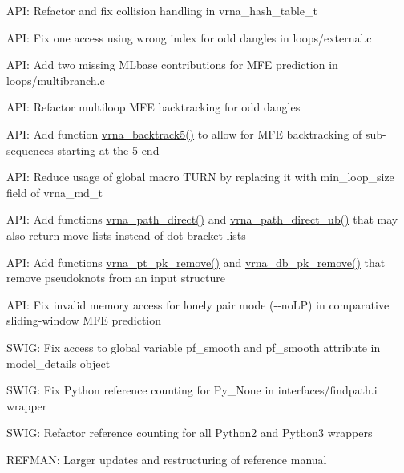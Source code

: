 \begin{DoxyItemize}
\item A\+PI\+: Refactor and fix collision handling in {\ttfamily vrna\+\_\+hash\+\_\+table\+\_\+t}
\item A\+PI\+: Fix one access using wrong index for odd dangles in {\ttfamily loops/external.\+c}
\item A\+PI\+: Add two missing {\ttfamily M\+Lbase} contributions for M\+FE prediction in {\ttfamily loops/multibranch.\+c}
\item A\+PI\+: Refactor multiloop M\+FE backtracking for odd dangles
\item A\+PI\+: Add function {\ttfamily \mbox{\hyperlink{group__mfe__backtracking_gaaee7355f060fe9eed8e687522567715e}{vrna\+\_\+backtrack5()}}} to allow for M\+FE backtracking of sub-\/sequences starting at the 5\textquotesingle{}-\/end
\item A\+PI\+: Reduce usage of global macro {\ttfamily T\+U\+RN} by replacing it with {\ttfamily min\+\_\+loop\+\_\+size} field of {\ttfamily vrna\+\_\+md\+\_\+t}
\item A\+PI\+: Add functions {\ttfamily \mbox{\hyperlink{group__paths__direct_gacba096caf9a6fe134f33a5afcf2248d8}{vrna\+\_\+path\+\_\+direct()}}} and {\ttfamily \mbox{\hyperlink{group__paths__direct_ga51d9edaeb42d1d178ea8ba46ccd4c8c0}{vrna\+\_\+path\+\_\+direct\+\_\+ub()}}} that may also return move lists instead of dot-\/bracket lists
\item A\+PI\+: Add functions {\ttfamily \mbox{\hyperlink{group__struct__utils__pair__table_gae8f31c859b48f97b8af889e914e4d040}{vrna\+\_\+pt\+\_\+pk\+\_\+remove()}}} and {\ttfamily \mbox{\hyperlink{group__struct__utils__dot__bracket_ga97dbebaa3fc49524cf5afa338a6c52ee}{vrna\+\_\+db\+\_\+pk\+\_\+remove()}}} that remove pseudoknots from an input structure
\item A\+PI\+: Fix invalid memory access for lonely pair mode ({\ttfamily -\/-\/no\+LP}) in comparative sliding-\/window M\+FE prediction
\item S\+W\+IG\+: Fix access to global variable {\ttfamily pf\+\_\+smooth} and {\ttfamily pf\+\_\+smooth} attribute in {\ttfamily model\+\_\+details} object
\item S\+W\+IG\+: Fix Python reference counting for {\ttfamily Py\+\_\+\+None} in {\ttfamily interfaces/findpath.\+i} wrapper
\item S\+W\+IG\+: Refactor reference counting for all Python2 and Python3 wrappers
\item R\+E\+F\+M\+AN\+: Larger updates and restructuring of reference manual
\end{DoxyItemize}

